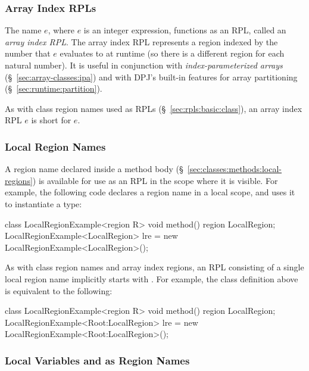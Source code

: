 \subsubsection{Array Index RPLs%
\label{sec:rpls:basic:array}}

The name \kwd{[}$e$\kwd{]}, where $e$ is an integer expression,
functions as an RPL, called an \emph{array index RPL}.  The array
index RPL represents a region indexed by the number that $e$
evaluates to at runtime (so there is a different region for each
natural number).  It is useful in conjunction with
\emph{index-parameterized arrays} (\S~\ref{sec:array-classes:ipa}) and
with DPJ's built-in features for array partitioning
(\S~\ref{sec:runtime:partition}).

As with class region names used as RPLs
(\S~\ref{sec:rpls:basic:class}), an array index RPL \kwd{[}$e$\kwd{]}
is short for \kwd{Root:[}$e$\kwd{]}.

\subsubsection{Local Region Names%
\label{sec:rpls:basic:local}}


A region name declared inside a method body
(\S~\ref{sec:classes:methods:local-regions}) is available for use as
an RPL in the scope where it is visible.  For example, the following
code declares a region name  in a local scope, and
uses it to instantiate a type:
%
\begin{dpjlisting}
class LocalRegionExample<region R> {
  void method() {
    region LocalRegion;
    LocalRegionExample<LocalRegion> lre = 
      new LocalRegionExample<LocalRegion>();
  }
}
\end{dpjlisting}
%

As with class region names and array index regions, an RPL consisting
of a single local region name implicitly starts with .  For
example, the class definition above is equivalent to the following:
%
\begin{dpjlisting}
class LocalRegionExample<region R> {
  void method() {
    region LocalRegion;
    LocalRegionExample<Root:LocalRegion> lre = 
      new LocalRegionExample<Root:LocalRegion>();
  }
}
\end{dpjlisting}
%


\subsubsection{ Local Variables and  as Region Names%
\label{sec:rpls:basic:var}}

